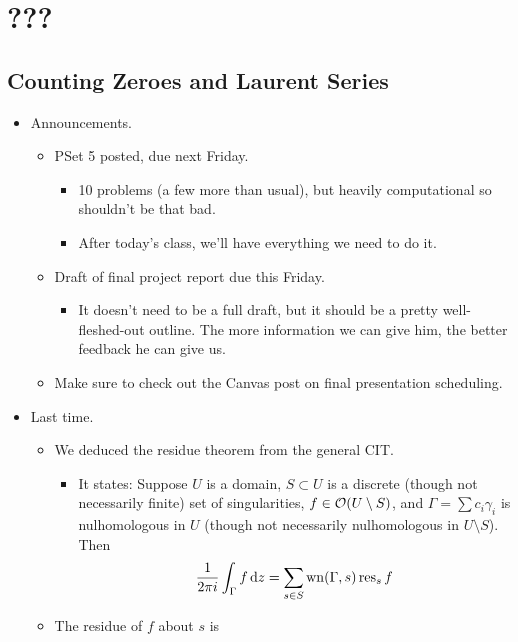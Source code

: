 \documentclass[../notes.tex]{subfiles}
\begin{document}
\chapter{???}
\section{Counting Zeroes and Laurent Series}
\begin{itemize}
    \item {}Announcements.
    \begin{itemize}
        \item PSet 5 posted, due next Friday.
        \begin{itemize}
            \item 10 problems (a few more than usual), but heavily computational so shouldn't be that bad.
            \item After today's class, we'll have everything we need to do it.
        \end{itemize}
        \item Draft of final project report due this Friday.
        \begin{itemize}
            \item It doesn't need to be a full draft, but it should be a pretty well-fleshed-out outline. The more information we can give him, the better feedback he can give us.
        \end{itemize}
        \item Make sure to check out the Canvas post on final presentation scheduling.
    \end{itemize}
    \item Last time.
    \begin{itemize}
        \item We deduced the residue theorem from the general CIT.
        \begin{itemize}
            \item It states: Suppose $U$ is a domain, $S\subset U$ is a discrete (though not necessarily finite) set of singularities, $f\in\mathcal{O}(U\setminus S)$, and $\Gamma=\sum c_i\gamma_i$ is nulhomologous in $U$ (though not necessarily nulhomologous in $U\setminus S$). Then
            \begin{equation*}
                \frac{1}{2\pi i}\int_\Gamma f\dd{z} = \sum_{s\in S}\operatorname{wn}(\Gamma,s)\operatorname{res}_sf
            \end{equation*}
        \end{itemize}
        \item The residue of $f$ about $s$ is

\end{itemize}
\end{itemize}
\end{document}

